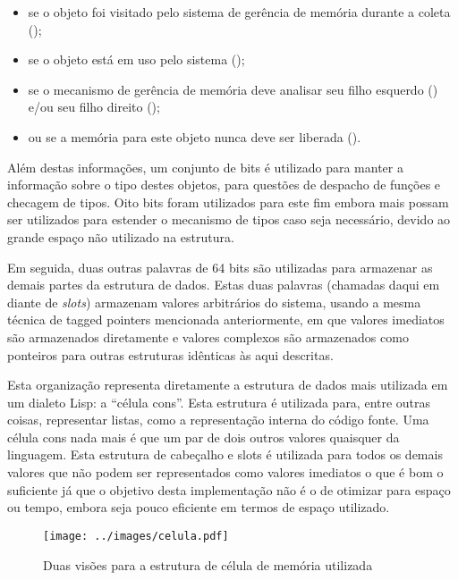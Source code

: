 \begin{itemize}

\item se o objeto foi visitado pelo sistema de gerência de memória durante a
coleta ();

\item  se o objeto está em uso pelo sistema ();

\item  se o mecanismo de gerência de memória deve analisar seu filho esquerdo
() e/ou seu filho direito
();

\item  ou se a memória para este objeto nunca deve ser liberada
().

\end{itemize}

Além destas informações, um conjunto de bits é utilizado para manter a
informação sobre o tipo destes objetos, para questões de despacho de funções e
checagem de tipos. Oito bits foram utilizados para este fim embora mais possam
ser utilizados para estender o mecanismo de tipos caso seja necessário, devido
ao grande espaço não utilizado na estrutura.

Em seguida, duas outras palavras de 64 bits são utilizadas para armazenar as
demais partes da estrutura de dados. Estas duas palavras (chamadas daqui em
diante de \textit{slots}) armazenam valores arbitrários do sistema, usando a
mesma técnica de tagged pointers mencionada anteriormente, em que valores
imediatos são armazenados diretamente e valores complexos são armazenados como
ponteiros para outras estruturas idênticas às aqui descritas. 

Esta organização representa diretamente a estrutura de dados mais utilizada em
um dialeto Lisp: a ``célula cons''. Esta estrutura é utilizada para, entre
outras coisas, representar listas, como a representação interna do código
fonte. Uma célula cons nada mais é que um par de dois outros valores quaisquer
da linguagem. Esta estrutura de cabeçalho e slots é utilizada para todos os
demais valores que não podem ser representados como valores imediatos o que é
bom o suficiente já que o objetivo desta implementação não é o de otimizar para
espaço ou tempo, embora seja pouco eficiente em termos de espaço utilizado.

\begin{figure}[h!]
\centering
\texttt{[image: ../images/celula.pdf]}
\caption{Duas visões para a estrutura de célula de memória utilizada}
\label{fig:celula}
\end{figure}

